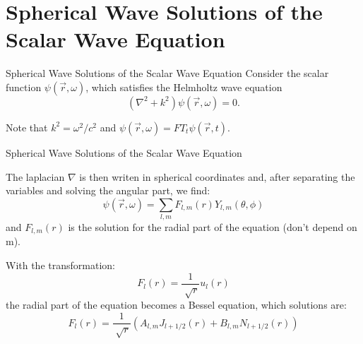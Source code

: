 \documentclass[10pt]{beamer}
\begin{document}

\section{Spherical Wave Solutions of the Scalar Wave Equation}


\begin{frame}[fragile]{Spherical Wave Solutions of the Scalar Wave Equation}
    Consider the scalar function $\psi(\vec{r},\omega)$, which satisfies the Helmholtz wave equation\\
      \begin{equation*}
        \left(\nabla^2 + k^2\right)\psi(\vec{r},\omega) = 0 .
      \end{equation*}

    Note that $k^2=\omega^2/c^2$ and $\psi(\vec{r},\omega)=FT_t{\psi(\vec{r},t)}$.

\end{frame}


\begin{frame}[fragile]{Spherical Wave Solutions of the Scalar Wave Equation}

The laplacian $\nabla$ is then writen in spherical coordinates and, after separating the variables and solving the angular part, we find:
  \begin{equation*}
    \psi(\vec{r},\omega)=\sum_{l,m}F_{l,m}(r)Y_{l,m}(\theta,\phi)
  \end{equation*}
and $F_{l,m}(r)$ is the solution for the radial part of the equation (don't depend on m).

With the transformation:
  \begin{equation*}
      F_l(r)=\frac{1}{\sqrt[]{r}}u_l(r)
  \end{equation*}
the radial part of the equation becomes a Bessel equation, which solutions are:
\begin{equation*}
F_l(r)=\frac{1}{\sqrt[]{r}}\left( A_{l,m}J_{l+1/2}(r) + B_{l,m}N_{l+1/2}(r) \right)
\end{equation*}

\end{frame}

\end{document}
